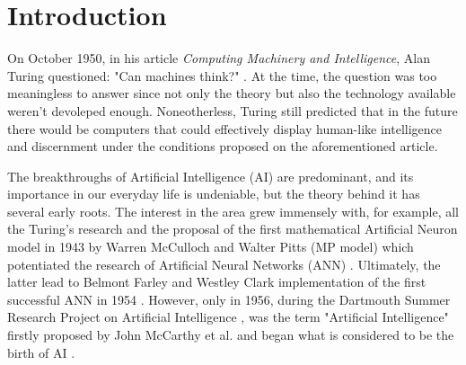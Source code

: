 \documentclass[12pt]{article}
\begin{document}



\section{Introduction}
On October 1950, in his article \textit{Computing Machinery and Intelligence}, Alan Turing questioned: "Can machines think?" \autocite{turingCOMPUTINGMACHINERYINTELLIGENCE1950}. At the time, the question was too meaningless to answer since not only the theory but also the technology available weren't devoleped enough. Noneotherless, Turing still predicted that in the future there would be computers that could effectively display human-like intelligence and discernment under the conditions proposed on the aforementioned article. 

\par The breakthroughs of Artificial Intelligence (AI) are predominant, and its importance in our everyday life is undeniable, but the theory behind it has several early roots. The interest in the area grew immensely with, for example, all the Turing's research and the proposal of the first mathematical Artificial Neuron model in 1943 by Warren McCulloch and Walter Pitts (MP model) \autocite{LogicalCalculusIdeas,liSurveyConvolutionalNeural2020} which potentiated the research of Artificial Neural Networks (ANN) \autocite{zhangStudyArtificialIntelligence2021}. Ultimately, the latter lead to Belmont Farley and Westley Clark implementation of the first successful ANN in 1954 \autocite{farleySimulationSelforganizingSystems1954}. However, only in 1956, during the Dartmouth Summer Research Project on Artificial Intelligence \autocite{mccarthyPROPOSALDARTMOUTHSUMMER}, was the term "Artificial Intelligence" firstly proposed by John McCarthy et al. and began what is considered to be the birth of AI \autocite{zhangStudyArtificialIntelligence2021}.
\end{document}

